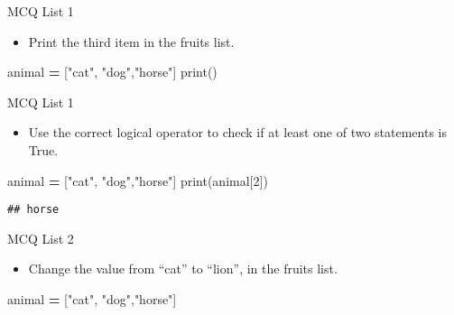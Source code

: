 \documentclass[
  8pt,
  ignorenonframetext,
]{beamer}
\newenvironment{Shaded}{\begin{snugshade}}{\end{snugshade}}
\newcommand{\BuiltInTok}[1]{#1}
\newcommand{\DecValTok}[1]{\textcolor[rgb]{0.00,0.00,0.81}{#1}}
\newcommand{\NormalTok}[1]{#1}
\newcommand{\OperatorTok}[1]{\textcolor[rgb]{0.81,0.36,0.00}{\textbf{#1}}}
\newcommand{\StringTok}[1]{\textcolor[rgb]{0.31,0.60,0.02}{#1}}
\providecommand{\tightlist}{%
  \setlength{\itemsep}{0pt}\setlength{\parskip}{0pt}}
\begin{document}
\begin{frame}[fragile]{MCQ List 1}
\protect\hypertarget{mcq-list-1}{}
\begin{itemize}
\tightlist
\item
  Print the third item in the fruits list.
\end{itemize}

\begin{Shaded}
\begin{Highlighting}[]
\NormalTok{animal }\OperatorTok{=}\NormalTok{ [}\StringTok{"cat"}\NormalTok{, }\StringTok{"dog"}\NormalTok{,}\StringTok{"horse"}\NormalTok{]}
\BuiltInTok{print}\NormalTok{()}
\end{Highlighting}
\end{Shaded}
\end{frame}

\begin{frame}[fragile]{MCQ List 1}
\protect\hypertarget{mcq-list-1-1}{}
\begin{itemize}
\tightlist
\item
  Use the correct logical operator to check if at least one of two
  statements is True.
\end{itemize}

\begin{Shaded}
\begin{Highlighting}[]
\NormalTok{animal }\OperatorTok{=}\NormalTok{ [}\StringTok{"cat"}\NormalTok{, }\StringTok{"dog"}\NormalTok{,}\StringTok{"horse"}\NormalTok{]}
\BuiltInTok{print}\NormalTok{(animal[}\DecValTok{2}\NormalTok{])}
\end{Highlighting}
\end{Shaded}

\begin{verbatim}
## horse
\end{verbatim}
\end{frame}

\begin{frame}[fragile]{MCQ List 2}
\protect\hypertarget{mcq-list-2}{}
\begin{itemize}
\tightlist
\item
  Change the value from ``cat'' to ``lion'', in the fruits list.
\end{itemize}

\begin{Shaded}
\begin{Highlighting}[]
\NormalTok{animal }\OperatorTok{=}\NormalTok{ [}\StringTok{"cat"}\NormalTok{, }\StringTok{"dog"}\NormalTok{,}\StringTok{"horse"}\NormalTok{]}
\end{Highlighting}
\end{Shaded}
\end{frame}
\end{document}
